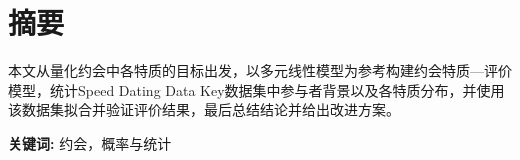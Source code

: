 \section*{ \centering 摘要}

\vskip0.5cm
本文从量化约会中各特质的目标出发，以多元线性模型为参考构建约会特质—评价模型，统计Speed Dating Data Key数据集中参与者背景以及各特质分布，并使用该数据集拟合并验证评价结果，最后总结结论并给出改进方案。


\textbf{关键词:}  约会，概率与统计







